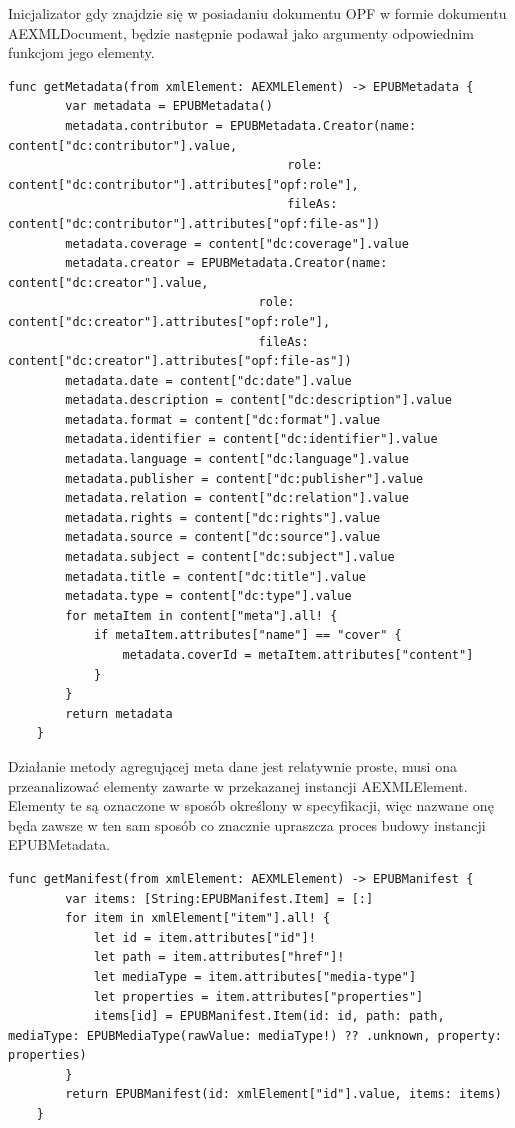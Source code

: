 Inicjalizator gdy znajdzie się w posiadaniu dokumentu OPF w formie dokumentu AEXMLDocument, będzie następnie podawał jako argumenty odpowiednim funkcjom jego elementy.

\begin{lstlisting}[caption={Implementacja metody getMetadata(from xmlElement:).},language=swift-reference]
    func getMetadata(from xmlElement: AEXMLElement) -> EPUBMetadata {
        var metadata = EPUBMetadata()
        metadata.contributor = EPUBMetadata.Creator(name: content["dc:contributor"].value,
                                       role: content["dc:contributor"].attributes["opf:role"],
                                       fileAs: content["dc:contributor"].attributes["opf:file-as"])
        metadata.coverage = content["dc:coverage"].value
        metadata.creator = EPUBMetadata.Creator(name: content["dc:creator"].value,
                                   role: content["dc:creator"].attributes["opf:role"],
                                   fileAs: content["dc:creator"].attributes["opf:file-as"])
        metadata.date = content["dc:date"].value
        metadata.description = content["dc:description"].value
        metadata.format = content["dc:format"].value
        metadata.identifier = content["dc:identifier"].value
        metadata.language = content["dc:language"].value
        metadata.publisher = content["dc:publisher"].value
        metadata.relation = content["dc:relation"].value
        metadata.rights = content["dc:rights"].value
        metadata.source = content["dc:source"].value
        metadata.subject = content["dc:subject"].value
        metadata.title = content["dc:title"].value
        metadata.type = content["dc:type"].value
        for metaItem in content["meta"].all! {
            if metaItem.attributes["name"] == "cover" {
                metadata.coverId = metaItem.attributes["content"]
            }
        }
        return metadata
    }
\end{lstlisting}

Działanie metody agregującej meta dane jest relatywnie proste, musi ona przeanalizować elementy zawarte w przekazanej instancji AEXMLElement. Elementy te są oznaczone w sposób określony w specyfikacji, więc nazwane onę będa zawsze w ten sam sposób co znacznie upraszcza proces budowy instancji EPUBMetadata.

\begin{lstlisting}[caption={Implementacja metody getManifest(from xmlElement:).},language=swift-reference]
    func getManifest(from xmlElement: AEXMLElement) -> EPUBManifest {
        var items: [String:EPUBManifest.Item] = [:]
        for item in xmlElement["item"].all! {
            let id = item.attributes["id"]!
            let path = item.attributes["href"]!
            let mediaType = item.attributes["media-type"]
            let properties = item.attributes["properties"]
            items[id] = EPUBManifest.Item(id: id, path: path, mediaType: EPUBMediaType(rawValue: mediaType!) ?? .unknown, property: properties)
        }
        return EPUBManifest(id: xmlElement["id"].value, items: items)
    }
\end{lstlisting}

